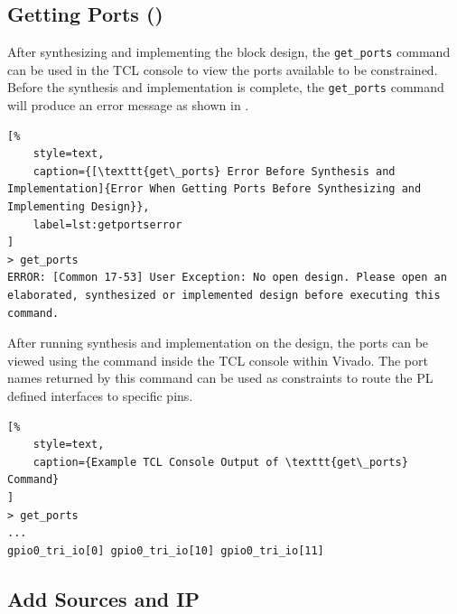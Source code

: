 




\subsection{Getting Ports ()}

After synthesizing and implementing the block design, the \texttt{get\_ports} command can be used in the TCL console to view the ports available to be constrained. Before the synthesis and implementation is complete, the \texttt{get\_ports} command will produce an error message as shown in .


\begin{lstlisting}[%
	style=text,
	caption={[\texttt{get\_ports} Error Before Synthesis and Implementation]{Error When Getting Ports Before Synthesizing and Implementing Design}},
	label=lst:getportserror
]
> get_ports
ERROR: [Common 17-53] User Exception: No open design. Please open an elaborated, synthesized or implemented design before executing this command.
\end{lstlisting}


After running synthesis and implementation on the design, the ports can be viewed using the  command inside the TCL console within Vivado. The port names returned by this command can be used as constraints to route the PL defined interfaces to specific pins.


\begin{lstlisting}[%
	style=text,
	caption={Example TCL Console Output of \texttt{get\_ports} Command}
]
> get_ports
...
gpio0_tri_io[0] gpio0_tri_io[10] gpio0_tri_io[11]
\end{lstlisting}



\subsection{Add Sources and IP}
\label{sub:addsources}

